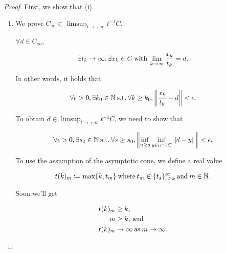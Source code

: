 \documentclass[a4paper,11pt]{jsarticle}
\newcommand{\NaturalNumberSet}{\mathbb{N}}
\newcommand{\SuchThat}{\:\text{s.t.}\:}
\begin{document}
\begin{proof}
  First, we show that (i).

  \begin{enumerate}[label=i-\alph*,align=CenterWithParen]
      \item We prove $C_{\infty} \subset \limsup_{t \to + \infty} t^{-1}C$.

      $\forall d \in C_{\infty}$,

      \begin{equation}
        \exists t_k \rightarrow \infty, \exists x_k \in C \:\text{with}\: \lim_{k \to \infty} \frac{x_k}{t_k} = d. \notag
      \end{equation}

      In other words, it holds that

      \begin{equation}
        \forall \epsilon > 0, \exists k_0 \in \NaturalNumberSet \SuchThat \forall k \geq k_0, \left\lVert \frac{x_k}{t_k} - d\right\rVert < \epsilon. \notag
      \end{equation}

      To obtain $d \in \limsup_{t \to + \infty} t^{-1}C$, we need to show that

      \begin{equation}
        \forall \epsilon > 0, \exists s_0 \in \NaturalNumberSet \SuchThat \forall s \geq s_0, \left\lVert \inf_{u \geq s} \inf_{y \in u^{-1}C} \left\lVert d - y \right\rVert \right\rVert < \epsilon. \notag
      \end{equation}

      To use the assumption of the asymptotic cone, we define a real value

      \begin{equation}
        t(k)_{m} \coloneqq \max \{k, t_{m}\} \:\text{where}\: t_{m} \in \{t_s\}_{s \geq k}^{\infty} \:\text{and}\: m \in \NaturalNumberSet. \notag
      \end{equation}

      Soon we'll get

      \begin{equation}
        \begin{split}
          t(k)_{m} &\geq k, \\
          m &\geq k, \:\text{and}\: \\
          t(k)_{m} &\to \infty \:\text{as}\: m \to \infty. \notag
        \end{split}
      \end{equation}


\end{enumerate}
\end{proof}
\end{document}
